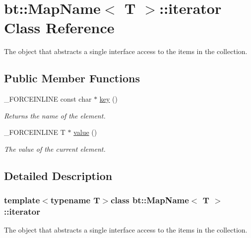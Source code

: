 \hypertarget{classbt_1_1_map_name_1_1iterator}{\section{bt\-:\-:Map\-Name$<$ T $>$\-:\-:iterator Class Reference}
\label{classbt_1_1_map_name_1_1iterator}
}


The object that abstracts a single interface access to the items in the collection.  


\subsection*{Public Member Functions}
\begin{DoxyCompactItemize}
\item 
\hypertarget{classbt_1_1_map_name_1_1iterator_a736088a16485547c51f15bc208832cc8}{\-\_\-\-F\-O\-R\-C\-E\-I\-N\-L\-I\-N\-E const char $\ast$ \hyperlink{classbt_1_1_map_name_1_1iterator_a736088a16485547c51f15bc208832cc8}{key} ()}\label{classbt_1_1_map_name_1_1iterator_a736088a16485547c51f15bc208832cc8}

\begin{DoxyCompactList}\small\item\em Returns the name of the element. \end{DoxyCompactList}\item 
\hypertarget{classbt_1_1_map_name_1_1iterator_ae34c26d2642b85f0e1a0421f7697deef}{\-\_\-\-F\-O\-R\-C\-E\-I\-N\-L\-I\-N\-E T $\ast$ \hyperlink{classbt_1_1_map_name_1_1iterator_ae34c26d2642b85f0e1a0421f7697deef}{value} ()}\label{classbt_1_1_map_name_1_1iterator_ae34c26d2642b85f0e1a0421f7697deef}

\begin{DoxyCompactList}\small\item\em The value of the current element. \end{DoxyCompactList}\end{DoxyCompactItemize}


\subsection{Detailed Description}
\subsubsection*{template$<$typename T$>$class bt\-::\-Map\-Name$<$ T $>$\-::iterator}

The object that abstracts a single interface access to the items in the collection. 